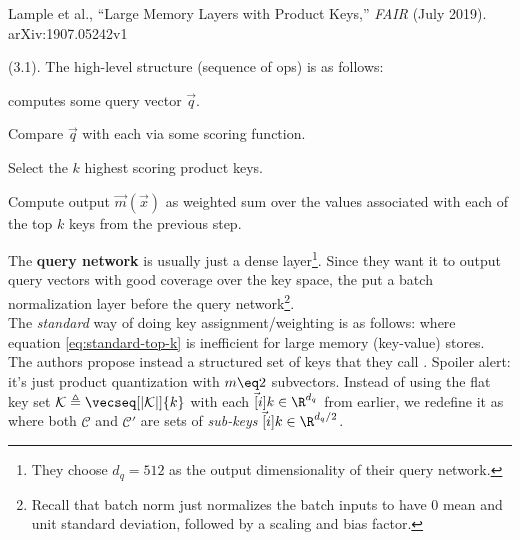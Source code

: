 \documentclass[11pt]{article}
\begin{document}
\vspace{-1em}
{\footnotesize Lample et al., ``Large Memory Layers with Product Keys,'' \textit{FAIR} (July 2019). arXiv:1907.05242v1}


 (3.1). The high-level structure (sequence of ops) is as follows:
\begin{compactenum}
	\item {} computes some query vector $\vec q$. 
	
	\item Compare $\vec q$ with each  via some scoring function.
	
	\item Select the $k$ highest scoring product keys. 
	
	\item Compute output $\vec m (\vec x)$ as weighted sum over the values associated with each of the top $k$ keys from the previous step.
\end{compactenum}
The \textbf{query network} is usually just a dense layer\footnote{They choose $d_q = 512$ as the output dimensionality of their query network.}. Since they want it to output query vectors with good coverage over the key space, the put a batch normalization layer before the query network\footnote{Recall that batch norm just normalizes the batch inputs to have 0 mean and unit standard deviation, followed by a scaling and bias factor.}. \\

The \textit{standard} way of doing key assignment/weighting is as follows:
where equation \ref{eq:standard-top-k} is inefficient for large memory (key-value) stores. The authors propose instead a structured set of keys that they call . Spoiler alert: it's just product quantization with $m \eq 2$ subvectors. Instead of using the flat key set $\mathcal K \triangleq \vecseq[|\mathcal K|]{k}$ with each $\vec[i]{k} \in \R^{d_q}$ from earlier, we redefine it as
where both $\mathcal C$ and $\mathcal C'$ are sets of \textit{sub-keys} $\vec[i]{k} \in \R^{d_q/2}$. 
\end{document}
